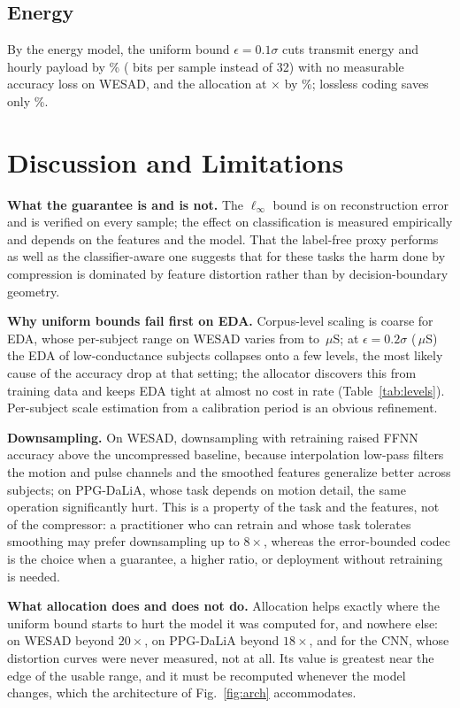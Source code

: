 \documentclass[journal]{IEEEtran}
\begin{document}
\subsection{Energy}
By the energy model, the uniform bound $\epsilon=0.1\sigma$ cuts transmit energy and hourly payload by \savingEe\% (\bpsEe{} bits per sample instead of 32) with no measurable accuracy loss on WESAD, and the allocation at \allocClfRatioBA$\times$ by \allocClfSavingBA\%; lossless coding saves only \savingLossless\%.

\section{Discussion and Limitations}
\textbf{What the guarantee is and is not.} The $\ell_\infty$ bound is on reconstruction error and is verified on every sample; the effect on classification is measured empirically and depends on the features and the model. That the label-free proxy performs as well as the classifier-aware one suggests that for these tasks the harm done by compression is dominated by feature distortion rather than by decision-boundary geometry.

\textbf{Why uniform bounds fail first on EDA.} Corpus-level scaling is coarse for EDA, whose per-subject range on WESAD varies from \minEDARange{} to \maxEDARange\,$\mu$S; at $\epsilon=0.2\sigma$ (\epsEDAEf\,$\mu$S) the EDA of low-conductance subjects collapses onto a few levels, the most likely cause of the accuracy drop at that setting; the allocator discovers this from training data and keeps EDA tight at almost no cost in rate (Table~\ref{tab:levels}). Per-subject scale estimation from a calibration period is an obvious refinement.

\textbf{Downsampling.} On WESAD, downsampling with retraining raised FFNN accuracy above the uncompressed baseline, because interpolation low-pass filters the motion and pulse channels and the smoothed features generalize better across subjects; on PPG-DaLiA, whose task depends on motion detail, the same operation significantly hurt. This is a property of the task and the features, not of the compressor: a practitioner who can retrain and whose task tolerates smoothing may prefer downsampling up to $8\times$, whereas the error-bounded codec is the choice when a guarantee, a higher ratio, or deployment without retraining is needed.

\textbf{What allocation does and does not do.} Allocation helps exactly where the uniform bound starts to hurt the model it was computed for, and nowhere else: on WESAD beyond $20\times$, on PPG-DaLiA beyond $18\times$, and for the CNN, whose distortion curves were never measured, not at all. Its value is greatest near the edge of the usable range, and it must be recomputed whenever the model changes, which the architecture of Fig.~\ref{fig:arch} accommodates.
\end{document}
